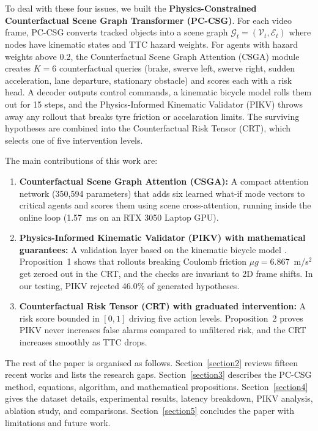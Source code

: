 \documentclass[preprint,12pt]{elsarticle}
\begin{document}
To deal with these four issues, we built the \textbf{Physics-Constrained Counterfactual Scene Graph Transformer (PC-CSG)}. For each video frame, PC-CSG converts tracked objects into a scene graph $\mathcal{G}_t = (\mathcal{V}_t, \mathcal{E}_t)$ where nodes have kinematic states and TTC hazard weights. For agents with hazard weights above 0.2, the Counterfactual Scene Graph Attention (CSGA) module creates $K=6$ counterfactual queries (brake, swerve left, swerve right, sudden acceleration, lane departure, stationary obstacle) and scores each with a risk head. A decoder outputs control commands, a kinematic bicycle model rolls them out for 15 steps, and the Physics-Informed Kinematic Validator (PIKV) throws away any rollout that breaks tyre friction or accelaration limits. The surviving hypotheses are combined into the Counterfactual Risk Tensor (CRT), which selects one of five intervention levels.

The main contributions of this work are:
\begin{enumerate}
    \item \textbf{Counterfactual Scene Graph Attention (CSGA):} A compact attention network (350,594 parameters) that adds six learned what-if mode vectors to critical agents and scores them using scene cross-attention, running inside the online loop (1.57~ms on an RTX 3050 Laptop GPU).
    \item \textbf{Physics-Informed Kinematic Validator (PIKV) with mathematical guarantees:} A validation layer based on the kinematic bicycle model \cite{kong2015kinematic}. Proposition~1 shows that rollouts breaking Coulomb friction $\mu g = 6.867$~m/s$^2$ get zeroed out in the CRT, and the checks are invariant to 2D frame shifts. In our testing, PIKV rejected 46.0\% of generated hypotheses.
    \item \textbf{Counterfactual Risk Tensor (CRT) with graduated intervention:} A risk score bounded in $[0,1]$ driving five action levels. Proposition~2 proves PIKV never increases false alarms compared to unfiltered risk, and the CRT increases smoothly as TTC drops.
\end{enumerate}

The rest of the paper is organised as follows. Section~\ref{section2} reviews fifteen recent works and lists the research gaps. Section~\ref{section3} describes the PC-CSG method, equations, algorithm, and mathematical propositions. Section~\ref{section4} gives the dataset details, experimental results, latency breakdown, PIKV analysis, ablation study, and comparisons. Section~\ref{section5} concludes the paper with limitations and future work.
\end{document}

